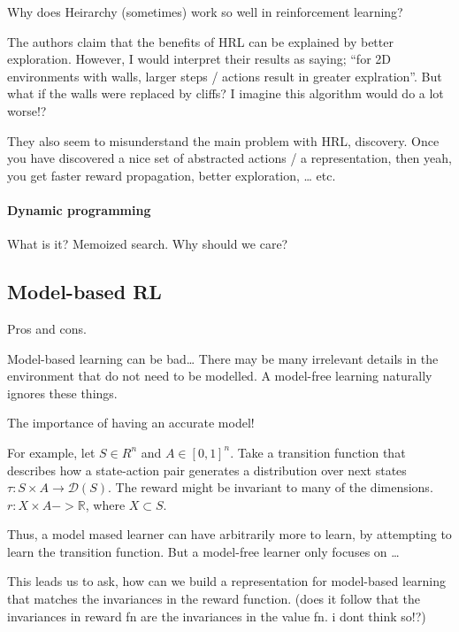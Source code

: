 Why does Heirarchy (sometimes) work so well in reinforcement learning?

The authors claim that the benefits of HRL can be explained by better
exploration. However, I would interpret their results as saying; ``for
2D environments with walls, larger steps / actions result in greater
explration''. But what if the walls were replaced by cliffs? I imagine
this algorithm would do a lot worse!?

They also seem to misunderstand the main problem with HRL, discovery.
Once you have discovered a nice set of abstracted actions / a
representation, then yeah, you get faster reward propagation, better
exploration, \ldots{} etc.

\hypertarget{dynamic-programming}{%
\paragraph{Dynamic programming}\label{dynamic-programming}}

What is it? Memoized search. Why should we care?

\hypertarget{model-based-rl}{%
\subsection{Model-based RL}\label{model-based-rl}}

Pros and cons.

Model-based learning can be bad\ldots{} There may be many irrelevant
details in the environment that do not need to be modelled. A model-free
learning naturally ignores these things.

The importance of having an accurate model!

For example, let \(S\in R^n\) and \(A\in [0, 1]^n\). Take a transition
function that describes how a state-action pair generates a distribution
over next states \(\tau: S \times A \to \mathcal D(S)\). The reward
might be invariant to many of the dimensions.
\(r: X \times A -> \mathbb R\), where \(X \subset S\).

Thus, a model mased learner can have arbitrarily more to learn, by
attempting to learn the transition function. But a model-free learner
only focuses on \ldots{}

This leads us to ask, how can we build a representation for model-based
learning that matches the invariances in the reward function. (does it
follow that the invariances in reward fn are the invariances in the
value fn. i dont think so!?)

